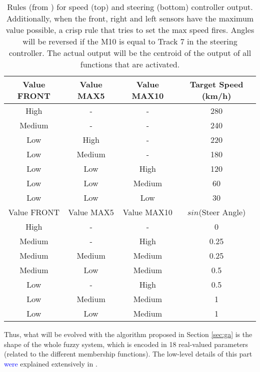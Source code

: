 \documentclass[10pt,journal,compsoc]{IEEEtran}
\begin{document}
\begin{table}[h!tb]
  \centering
  {\scriptsize
    \caption{Rules  (from \cite{salem_evo18}) for speed (top) and steering
      (bottom) controller output. Additionally, when 
      the front, right and left sensors have the maximum value
      possible, a crisp rule that tries to set the max speed
      fires.  Angles will be reversed
      if the M10 is equal to Track 7 in the steering controller. The
      actual output will be the centroid of the output of all functions
      that are activated. \label{tab:output}}
    \begin{tabular}{|c|c|c||c|}
\hline
      Value FRONT & Value MAX5 & Value MAX10 & Target Speed (km/h) \\
      \hline
      High & - & - & 280 \\
      Medium & - & - & 240 \\
      Low & High & - & 220 \\
      Low & Medium & - & 180 \\
      Low & Low & High & 120 \\
      Low & Low & Medium & 60 \\           
      Low & Low & Low & 30 \\     
\hline
\hline
      Value FRONT & Value MAX5 & Value MAX10 & $sin$(Steer Angle) \\
\hline
      High & - & - & 0 \\
      Medium & - & High & 0.25 \\
      Medium & Medium & Medium & 0.25 \\
      Medium & Low & Medium & 0.5 \\
      Low & - & High & 0.5 \\
      Low & Medium & Medium & 1 \\
      Low & Low & Medium & 1 \\ 
      
\hline
\end{tabular}
}
\end{table}



Thus, what will be evolved with the algorithm proposed in Section
\ref{sec:ga} is the shape of the whole fuzzy system, which is encoded
in 18 real-valued parameters (related to the different membership
functions). The low-level details of this part \textcolor{blue}{were} explained
extensively in \cite{DBLP:conf/cig/SalemMG19}. 
\end{document}
